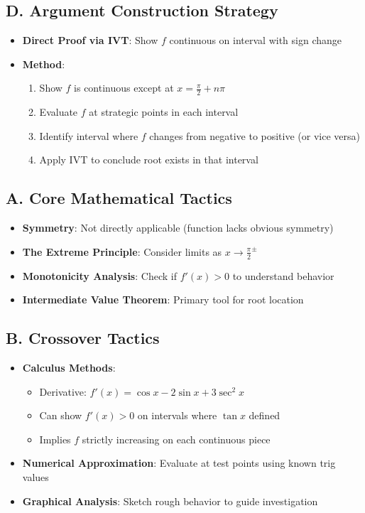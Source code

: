 \documentclass[]{article}
\begin{document}
\begin{strategicbox}
\subsection*{D. Argument Construction Strategy}
\begin{itemize}[leftmargin=*]
    \item \textbf{Direct Proof via IVT}: Show $f$ continuous on interval with sign change
    \item \textbf{Method}: 
    \begin{enumerate}
        \item Show $f$ is continuous except at $x = \frac{\pi}{2} + n\pi$
        \item Evaluate $f$ at strategic points in each interval
        \item Identify interval where $f$ changes from negative to positive (or vice versa)
        \item Apply IVT to conclude root exists in that interval
    \end{enumerate}
\end{itemize}
\end{strategicbox}

\begin{tacticalbox}
\subsection*{A. Core Mathematical Tactics}
\begin{itemize}[leftmargin=*]
    \item \textbf{Symmetry}: Not directly applicable (function lacks obvious symmetry)
    \item \textbf{The Extreme Principle}: Consider limits as $x \to \frac{\pi}{2}^{\pm}$
    \item \textbf{Monotonicity Analysis}: Check if $f'(x) > 0$ to understand behavior
    \item \textbf{Intermediate Value Theorem}: Primary tool for root location
\end{itemize}

\subsection*{B. Crossover Tactics}
\begin{itemize}[leftmargin=*]
    \item \textbf{Calculus Methods}: 
    \begin{itemize}
        \item Derivative: $f'(x) = \cos{x} - 2\sin{x} + 3\sec^2{x}$
        \item Can show $f'(x) > 0$ on intervals where $\tan{x}$ defined
        \item Implies $f$ strictly increasing on each continuous piece
    \end{itemize}
    \item \textbf{Numerical Approximation}: Evaluate at test points using known trig values
    \item \textbf{Graphical Analysis}: Sketch rough behavior to guide investigation
\end{itemize}
\end{tacticalbox}
\end{document}
